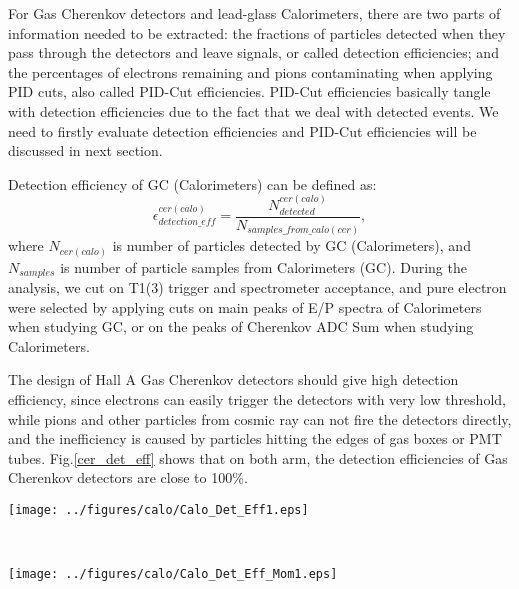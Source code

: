 \documentclass[a4paper,18.pt]{article}
\begin{document}
For Gas Cherenkov detectors and lead-glass Calorimeters, there are two parts of information needed to be extracted: the fractions of particles detected when they pass through the detectors and leave signals, or called detection efficiencies; and the percentages of electrons remaining and pions contaminating when applying PID cuts, also called PID-Cut efficiencies. PID-Cut efficiencies basically tangle with detection efficiencies due to the fact that we deal with detected events. We need to firstly evaluate detection efficiencies and PID-Cut efficiencies will be discussed in next section. 

Detection efficiency of GC (Calorimeters) can be defined as:
\begin{equation}
 \epsilon_{detection\_eff}^{cer(calo)} = \frac{N_{detected}^{cer(calo)}}{N_{samples\_from\_calo(cer)}},
\end{equation}
where $N_{cer(calo)}$ is number of particles detected by GC (Calorimeters), and $N_{samples}$ is number of particle samples from Calorimeters (GC). During the analysis, we cut on T1(3) trigger and spectrometer acceptance, and pure electron were selected by applying cuts on main peaks of E/P spectra of Calorimeters when studying GC, or on the peaks of Cherenkov ADC Sum when studying Calorimeters. 

The design of Hall A Gas Cherenkov detectors should give high detection efficiency, since electrons can easily trigger the detectors with very low threshold, while pions and other particles from cosmic ray can not fire the detectors directly, and the inefficiency is caused by particles hitting the edges of gas boxes or PMT tubes. Fig.\ref{cer_det_eff} shows that on both arm, the detection efficiencies of Gas Cherenkov detectors are close to 100\%.


 \begin{center}
\parbox[t]{0.9\textwidth}{
 \centerline{\texttt{[image: ../figures/calo/Calo\_Det\_Eff1.eps]}}
 \label{calo_det_eff}
}
\\
\parbox[t]{0.9\textwidth}{
 \centerline{\texttt{[image: ../figures/calo/Calo\_Det\_Eff\_Mom1.eps]}}
 \label{calo_det_eff_mom}
}
\end{center}
\end{document}
